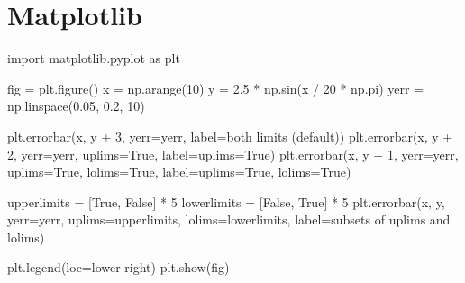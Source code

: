 \documentclass[
  letterpaper,
  DIV=11,
  numbers=noendperiod]{scrreprt}
\newenvironment{Shaded}{\begin{snugshade}}{\end{snugshade}}
\newcommand{\DecValTok}[1]{\textcolor[rgb]{0.68,0.00,0.00}{#1}}
\newcommand{\FloatTok}[1]{\textcolor[rgb]{0.68,0.00,0.00}{#1}}
\newcommand{\ImportTok}[1]{\textcolor[rgb]{0.00,0.46,0.62}{#1}}
\newcommand{\NormalTok}[1]{\textcolor[rgb]{0.00,0.23,0.31}{#1}}
\newcommand{\OperatorTok}[1]{\textcolor[rgb]{0.37,0.37,0.37}{#1}}
\newcommand{\StringTok}[1]{\textcolor[rgb]{0.13,0.47,0.30}{#1}}
\newcommand{\VariableTok}[1]{\textcolor[rgb]{0.07,0.07,0.07}{#1}}
\begin{document}
\hypertarget{matplotlib}{%
\section{Matplotlib}\label{matplotlib}}

\begin{Shaded}
\begin{Highlighting}[]
\ImportTok{import}\NormalTok{ matplotlib.pyplot }\ImportTok{as}\NormalTok{ plt}

\NormalTok{fig }\OperatorTok{=}\NormalTok{ plt.figure()}
\NormalTok{x }\OperatorTok{=}\NormalTok{ np.arange(}\DecValTok{10}\NormalTok{)}
\NormalTok{y }\OperatorTok{=} \FloatTok{2.5} \OperatorTok{*}\NormalTok{ np.sin(x }\OperatorTok{/} \DecValTok{20} \OperatorTok{*}\NormalTok{ np.pi)}
\NormalTok{yerr }\OperatorTok{=}\NormalTok{ np.linspace(}\FloatTok{0.05}\NormalTok{, }\FloatTok{0.2}\NormalTok{, }\DecValTok{10}\NormalTok{)}

\NormalTok{plt.errorbar(x, y }\OperatorTok{+} \DecValTok{3}\NormalTok{, yerr}\OperatorTok{=}\NormalTok{yerr, label}\OperatorTok{=}\StringTok{\textquotesingle{}both limits (default)\textquotesingle{}}\NormalTok{)}
\NormalTok{plt.errorbar(x, y }\OperatorTok{+} \DecValTok{2}\NormalTok{, yerr}\OperatorTok{=}\NormalTok{yerr, uplims}\OperatorTok{=}\VariableTok{True}\NormalTok{, label}\OperatorTok{=}\StringTok{\textquotesingle{}uplims=True\textquotesingle{}}\NormalTok{)}
\NormalTok{plt.errorbar(x, y }\OperatorTok{+} \DecValTok{1}\NormalTok{, yerr}\OperatorTok{=}\NormalTok{yerr, uplims}\OperatorTok{=}\VariableTok{True}\NormalTok{, lolims}\OperatorTok{=}\VariableTok{True}\NormalTok{,}
\NormalTok{             label}\OperatorTok{=}\StringTok{\textquotesingle{}uplims=True, lolims=True\textquotesingle{}}\NormalTok{)}

\NormalTok{upperlimits }\OperatorTok{=}\NormalTok{ [}\VariableTok{True}\NormalTok{, }\VariableTok{False}\NormalTok{] }\OperatorTok{*} \DecValTok{5}
\NormalTok{lowerlimits }\OperatorTok{=}\NormalTok{ [}\VariableTok{False}\NormalTok{, }\VariableTok{True}\NormalTok{] }\OperatorTok{*} \DecValTok{5}
\NormalTok{plt.errorbar(x, y, yerr}\OperatorTok{=}\NormalTok{yerr, uplims}\OperatorTok{=}\NormalTok{upperlimits, lolims}\OperatorTok{=}\NormalTok{lowerlimits,}
\NormalTok{             label}\OperatorTok{=}\StringTok{\textquotesingle{}subsets of uplims and lolims\textquotesingle{}}\NormalTok{)}

\NormalTok{plt.legend(loc}\OperatorTok{=}\StringTok{\textquotesingle{}lower right\textquotesingle{}}\NormalTok{)}
\NormalTok{plt.show(fig)}
\end{Highlighting}
\end{Shaded}
\end{document}
